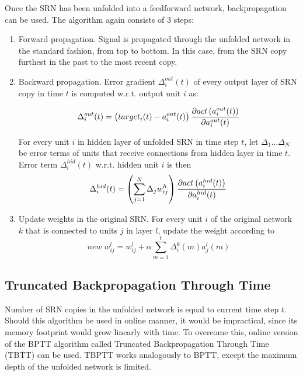 \documentclass[12pt,oneside]{fithesis2}
\begin{document}
Once the SRN has been unfolded into a feedforward network, backpropagation can be used. The algorithm again consists of 3 steps:
\begin{enumerate}
  \item Forward propagation. Signal is propagated through the unfolded network in the standard fashion, from top to bottom. In this case, from the SRN copy furthest in the past to the most recent copy.
  \item Backward propagation. Error gradient $\Delta^{out}_{i}(t)$ of every output layer of SRN copy in time $t$ is computed w.r.t. output unit $i$ as:
 
  $$\Delta^{out}_{i}(t) = \left(target_{i}(t) - a^{out}_{i}(t)\right) {{\partial{act\left(a^{out}_{i}(t)\right)}} \over {\partial a^{out}_{i}(t)}}$$
 
 
  For every unit $i$ in hidden layer of unfolded SRN in time step $t$, let $\Delta_1 \dots \Delta_N$ be error terms of units that receive connections from hidden layer in time $t$. Error term $\Delta^{hid}_{i}(t)$ w.r.t. hidden unit $i$ is then
  $$\Delta^{hid}_{i}(t) =\left(\sum\limits_{j=1}^{N} \Delta_{j}w_{ij}^{h}\right) {{\partial{act\left(a^{hid}_{i}(t)\right)}} \over {\partial a^{hid}_{i}(t)}}$$
  
  \item Update weights in the original SRN. For every unit $i$ of the original network $k$ that is connected to units $j$ in layer $l$, update the weight according to
  $$new \; w_{ij}^l = w_{ij}^l + \alpha \sum\limits_{m=1}^{t} \Delta_i^{k}\left(m\right) a_{j}^{l}\left(m\right)$$

\end{enumerate}


\subsection{Truncated Backpropagation Through Time}

Number of SRN copies in the unfolded network is equal to current time step $t$. Should this algorithm be used in online manner, it would be impractical, since its memory footprint would grow linearly with time. To overcome this, online version of the BPTT algorithm called Truncated Backpropagation Through Time (TBTT) can be used. TBPTT works analogously to BPTT, except the maximum depth of the unfolded network is limited.\par
\end{document}
